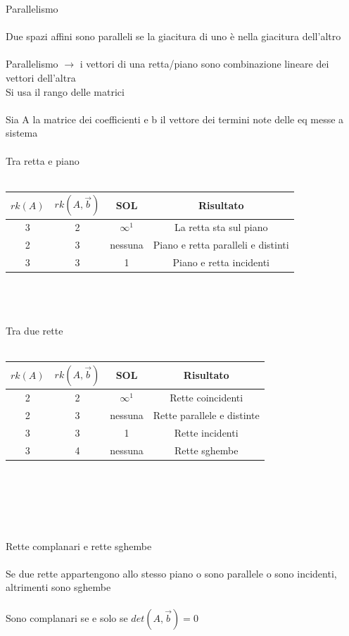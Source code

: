 \documentclass{article}
\begin{document}
{\Large Parallelismo}\\\\
Due spazi affini sono paralleli se la giacitura di uno è nella giacitura dell'altro\\\\
Parallelismo \(\rightarrow{}\) i vettori di una retta/piano sono combinazione lineare dei vettori dell'altra\\
Si usa il rango delle matrici\\\\
{\large Sia A la matrice dei coefficienti e b il vettore dei termini note delle eq messe a sistema}\\\\
Tra retta e piano\\\\
\begin{tabular}{|c|c|c|c|}
    \hline
    \(rk(A)\) & \(rk(A,\vec{b})\) & SOL & Risultato \\
    \hline
    3 & 2 & \(\infty^1\) & La retta sta sul piano \\
    \hline
    2 & 3 & nessuna & Piano e retta paralleli e distinti \\
    \hline
    3 & 3 & 1 & Piano e retta incidenti \\
    \hline
\end{tabular}\\\\\\
Tra due rette\\\\
\begin{tabular}{|c|c|c|c|}
    \hline
    \(rk(A)\) & \(rk(A,\vec{b})\) & SOL & Risultato \\
    \hline
    2 & 2 & \(\infty^1\) & Rette coincidenti \\
    \hline
    2 & 3 & nessuna &  Rette parallele e distinte\\
    \hline
    3 & 3 & 1 & Rette incidenti \\
    \hline
    3 & 4 & nessuna & Rette sghembe \\
    \hline
\end{tabular}\\\\\\\\\\
{\large Rette complanari e rette sghembe}\\\\
Se due rette appartengono allo stesso piano o sono parallele o sono incidenti, altrimenti sono sghembe\\\\
Sono complanari se e solo se \(det(A,\vec{b})=0\)
\end{document}
